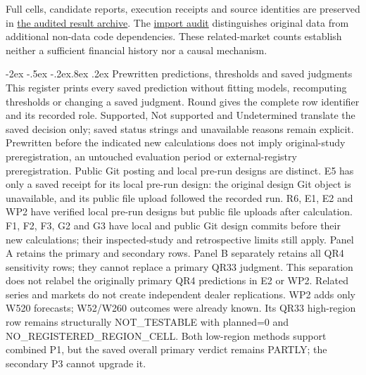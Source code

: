 \documentclass[10pt,a4paper]{article}
\makeatletter
\renewcommand\section{\@startsection{section}{1}{\z@}%
  {-2ex \@plus -.5ex \@minus -.2ex}{.8ex \@plus .2ex}%
  {\normalfont\large\bfseries}}
\makeatother
\begin{document}
Full cells, candidate reports, execution receipts and source identities are preserved in \href{https://github.com/ByronLi0207/financial-mathematics-paper-20261020/tree/submission-final/evidence/submission/final-jof/results/final-merge/wp2-cftc-mechanism}{the audited result archive}. The \href{https://github.com/ByronLi0207/financial-mathematics-paper-20261020/blob/submission-final/notes/submission/import-audit.md}{import audit} distinguishes original data from additional non-data code dependencies. These related-market counts establish neither a sufficient financial history nor a causal mechanism.

\clearpage
\section{Prewritten predictions, thresholds and saved judgments}\label{sup:submission-predictions}
This register prints every saved prediction without fitting models, recomputing thresholds or changing a saved judgment. Round gives the complete row identifier and its recorded role. Supported, Not supported and Undetermined translate the saved decision only; saved status strings and unavailable reasons remain explicit.
Prewritten before the indicated new calculations does not imply original-study preregistration, an untouched evaluation period or external-registry preregistration. Public Git posting and local pre-run designs are distinct. E5 has only a saved receipt for its local pre-run design: the original design Git object is unavailable, and its public file upload followed the recorded run. R6, E1, E2 and WP2 have verified local pre-run designs but public file uploads after calculation. F1, F2, F3, G2 and G3 have local and public Git design commits before their new calculations; their inspected-study and retrospective limits still apply.
Panel A retains the primary and secondary rows. Panel B separately retains all QR4 sensitivity rows; they cannot replace a primary QR33 judgment. This separation does not relabel the originally primary QR4 predictions in E2 or WP2. Related series and markets do not create independent dealer replications.
WP2 adds only W520 forecasts; W52/W260 outcomes were already known. Its QR33 high-region row remains structurally NOT\_TESTABLE with planned=0 and NO\_REGISTERED\_REGION\_CELL. Both low-region methods support combined P1, but the saved overall primary verdict remains PARTLY; the secondary P3 cannot upgrade it.
\end{document}

